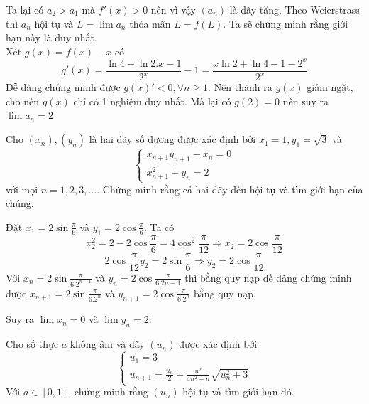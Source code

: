 \documentclass[11pt]{scrartcl}
\begin{document}
\begin{itemize}[label=, leftmargin=0em, itemsep=0.5em]
\begin{sol}
        Ta lại có $a_2 > a_1$ mà $f'(x) > 0$ nên vì vậy $(a_n)$ là dãy tăng. Theo Weierstrass thì $a_n$ hội tụ và $L = \lim a_n$ thỏa mãn $L = f(L)$. Ta sẽ chứng minh rằng giới hạn này là duy nhất.\\
        Xét $g(x) = f(x) - x$ có $$g'(x) = \frac{\ln4 + \ln2. x - 1}{2^x} - 1 = \frac{x\ln2 + \ln4 - 1 - 2^x}{2^x}$$
        Dễ dàng chứng minh được $g(x)' < 0, \forall n \geq 1$. Nên thành ra $g(x)$ giảm ngặt, cho nên $g(x)$ chỉ có 1 nghiệm duy nhất. Mà lại có $g(2) = 0$ nên suy ra $\lim a_n = 2$
    \end{sol}
    \begin{bt}
        Cho $({{x}_{n}}),({{y}_{n}})$ là hai dãy số dương được xác định bởi ${{x}_{1}}=1,{{y}_{1}}=\sqrt{3}$ và
        \[ \begin{cases} {{x}_{n+1}}{{y}_{n+1}}-{{x}_{n}}=0 \\ x_{n+1}^{2}+{{y}_{n}}=2 \end{cases} \] với mọi $n=1,2,3,\ldots$.
Chứng minh rằng cả hai dãy đều hội tụ và tìm giới hạn của chúng.
    \end{bt}

    \begin{sol}
        Đặt $x_1 = 2\sin{\frac{\pi}{6}}$ và $y_1 = 2\cos{\frac{\pi}{6}}$. Ta có 
        $$x_2^2 = 2 - 2\cos{\frac{\pi}{6}} = 4\cos^2{\frac{\pi}{12}} \Rightarrow x_2 = 2\cos{\frac{\pi}{12}}$$
        $$2\cos{\frac{\pi}{12}}y_2 =  2\sin{\frac{\pi}{6}} \Rightarrow y_2 = 2\cos{\frac{\pi}{12}}$$
        Với  $x_n = 2\sin{\frac{\pi}{6.2^{n-1}}}$ và $y_n = 2\cos{\frac{\pi}{6.2{n-1}}}$ thì bằng quy nạp dễ dàng chứng minh được $x_{n+1} = 2\sin{\frac{\pi}{6.2^{n}}}$ và $y_{n+1} = 2\cos{\frac{\pi}{6.2^{n}}}$ bằng quy nạp. 


        Suy ra $\lim x_n = 0$ và $\lim y_n = 2$.
    \end{sol}
    
    \begin{bt}
        Cho số thực $a$ không âm và dãy $(u_n)$ được xác định bởi\[ \begin{cases} u_1=3\\ u_{n+1}=\frac{u_n}{2}+\frac{n^2}{4n^2+a}\sqrt{u_n^2+3} \end{cases} \]
    Với $a\in [0,1]$, chứng minh rằng $(u_n)$ hội tụ và tìm giới hạn đó.
    \end{bt}


\end{itemize}
\end{document}
